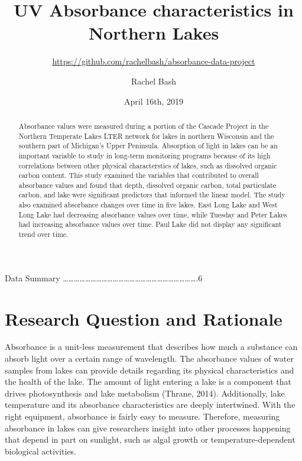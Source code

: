 \documentclass[12pt,]{article}
\title{UV Absorbance characteristics in Northern Lakes}
\subtitle{\url{https://github.com/rachelbash/absorbance-data-project}}
\author{Rachel Bash}
\date{April 16th, 2019}
\begin{document}
\maketitle
\begin{abstract}
Absorbance values were measured during a portion of the Cascade Project
in the Northern Temperate Lakes LTER network for lakes in northern
Wisconsin and the southern part of Michigan's Upper Peninsula.
Absorption of light in lakes can be an important variable to study in
long-term monitoring programs because of its high correlations between
other physical characterstics of lakes, such as dissolved organic carbon
content. This study examined the variables that contributed to overall
absorbance values and found that depth, dissolved organic carbon, total
particulate carbon, and lake were significant predictors that informed
the linear model. The study also examined absorbance changes over time
in five lakes. East Long Lake and West Long Lake had decreasing
absorbance values over time, while Tuesday and Peter Lakes had
increasing absorbance values over time. Paul Lake did not display any
significant trend over time.
\end{abstract}

\newpage

\tableofcontents  \newpage
{} Data Summary
\ldots{}\ldots{}\ldots{}\ldots{}\ldots{}\ldots{}\ldots{}\ldots{}\ldots{}\ldots{}\ldots{}\ldots{}\ldots{}\ldots{}\ldots{}\ldots{}\ldots{}\ldots{}\ldots{}\ldots{}\ldots{}\ldots{}\ldots{}\ldots{}.6
\newpage
\listoffigures  \newpage

\section{Research Question and
Rationale}\label{research-question-and-rationale}

Absorbance is a unit-less measurement that describes how much a
substance can absorb light over a certain range of wavelength. The
absorbance values of water samples from lakes can provide details
regarding its physical characteristics and the health of the lake. The
amount of light entering a lake is a component that drives
photosynthesis and lake metabolism (Thrane, 2014). Additionally, lake
temperature and its absorbance characteristics are deeply intertwined.
With the right equipment, absorbance is fairly easy to measure.
Therefore, measuring absorbance in lakes can give researchers insight
into other processes happening that depend in part on sunlight, such as
algal growth or temperature-dependent biological activities.
\end{document}
